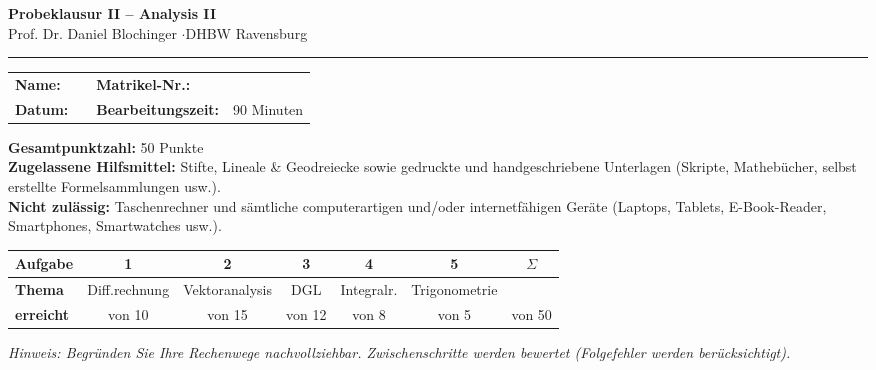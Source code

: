 \documentclass[a4paper,11pt]{article}
\begin{document}
\begin{center}
  {\LARGE\bfseries\color{accent} Probeklausur II -- Analysis II}\\[0.3em]
  {\normalsize Prof. Dr. Daniel Blochinger \quad$\cdot$\quad DHBW Ravensburg}
\end{center}
\vspace{0.6em}
\noindent\textcolor{gridcol}{\rule{\linewidth}{1pt}}\par\vspace{0.8em}

\renewcommand{\arraystretch}{1.8}
\noindent
\begin{tabular}{@{}p{2.2cm}p{5.3cm}@{\quad}p{3.6cm}p{4.5cm}@{}}
\textbf{Name:} & \textcolor{gridcol}{\hrulefill} & \textbf{Matrikel-Nr.:} & \textcolor{gridcol}{\hrulefill}\\
\textbf{Datum:} & \textcolor{gridcol}{\hrulefill} & \textbf{Bearbeitungszeit:} & 90 Minuten\\
\end{tabular}
\renewcommand{\arraystretch}{1.0}

\vspace{0.6em}
\noindent\textbf{Gesamtpunktzahl:} 50 Punkte\\[0.4em]
\noindent\textbf{Zugelassene Hilfsmittel:} Stifte, Lineale \& Geodreiecke sowie gedruckte und
handgeschriebene Unterlagen (Skripte, Mathebücher, selbst erstellte Formelsammlungen usw.).\\[0.2em]
\noindent\textbf{Nicht zulässig:} Taschenrechner und sämtliche computerartigen und/oder
internetfähigen Geräte (Laptops, Tablets, E-Book-Reader, Smartphones, Smartwatches usw.).

\vspace{1.0em}

\renewcommand{\arraystretch}{1.6}
\noindent
\begin{tabular}{|>{\bfseries}l|c|c|c|c|c||c|}
\hline
Aufgabe & 1 & 2 & 3 & 4 & 5 & $\Sigma$\\\hline
Thema & Diff.rechnung & Vektoranalysis & DGL & Integralr. & Trigonometrie & \\\hline
erreicht & von 10 & von 15 & von 12 & von 8 & von 5 & von 50\\\hline
\end{tabular}
\renewcommand{\arraystretch}{1.0}

\vspace{1.0em}
\noindent\textit{Hinweis: Begründen Sie Ihre Rechenwege nachvollziehbar. Zwischenschritte werden
bewertet (Folgefehler werden berücksichtigt).}
\end{document}
